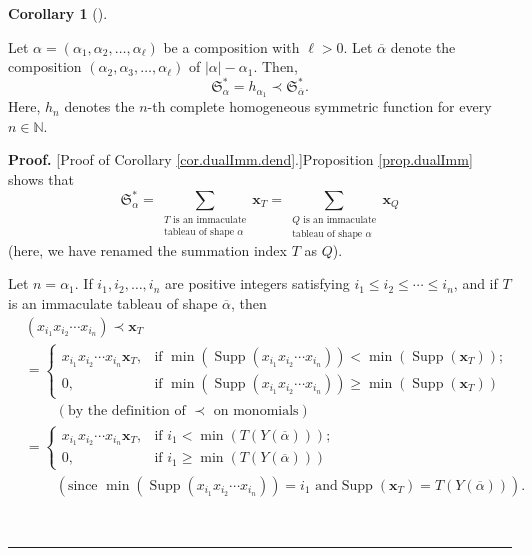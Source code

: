 \documentclass[numbers=enddot,12pt,final,onecolumn,notitlepage,abstracton]{scrartcl}%
\theoremstyle{definition}
\newtheorem{coro}[theo]{Corollary}
\newenvironment{corollary}[1][]
{\begin{coro}[#1]\begin{leftbar}}
{\end{leftbar}\end{coro}}
\newenvironment{proof}[1][Proof]{\noindent\textbf{#1.} }{\ \rule{0.5em}{0.5em}}
\let\sumnonlimits\sum
\renewcommand{\sum}{\sumnonlimits\limits}
\begin{document}
\begin{corollary}
\label{cor.dualImm.dend}Let $\alpha=\left(  \alpha_{1},\alpha_{2}%
,\ldots,\alpha_{\ell}\right)  $ be a composition with $\ell>0$. Let
$\overline{\alpha}$ denote the composition $\left(  \alpha_{2},\alpha
_{3},\ldots,\alpha_{\ell}\right)  $ of $\left\vert \alpha\right\vert
-\alpha_{1}$. Then,%
\[
\mathfrak{S}_{\alpha}^{\ast}=h_{\alpha_{1}}\left.  \prec\right.
\mathfrak{S}_{\overline{\alpha}}^{\ast}.
\]
Here, $h_{n}$ denotes the $n$-th complete homogeneous symmetric function for
every $n\in\mathbb{N}$.
\end{corollary}

\begin{proof}
[Proof of Corollary \ref{cor.dualImm.dend}.]Proposition \ref{prop.dualImm}
shows that
\begin{equation}
\mathfrak{S}_{\alpha}^{\ast}=\sum_{\substack{T\text{ is an immaculate}%
\\\text{tableau of shape }\alpha}}\mathbf{x}_{T}=\sum_{\substack{Q\text{ is an
immaculate}\\\text{tableau of shape }\alpha}}\mathbf{x}_{Q}
\label{pf.cor.dualImm.dend.LHS}%
\end{equation}
(here, we have renamed the summation index $T$ as $Q$).

Let $n=\alpha_{1}$. If $i_{1},i_{2},\ldots,i_{n}$ are positive integers
satisfying $i_{1}\leq i_{2}\leq\cdots\leq i_{n}$, and if $T$ is an immaculate
tableau of shape $\overline{\alpha}$, then%
\begin{align}
&  \left(  x_{i_{1}}x_{i_{2}}\cdots x_{i_{n}}\right)  \left.  \prec\right.
\mathbf{x}_{T}\nonumber\\
&  =
\begin{cases}
x_{i_{1}}x_{i_{2}}\cdots x_{i_{n}}\mathbf{x}_{T}, & \text{if } \min\left(
\operatorname*{Supp}\left(  x_{i_{1}}x_{i_{2}}\cdots x_{i_{n}}\right)
\right)  <\min\left(  \operatorname*{Supp}\left(  \mathbf{x}_{T}\right)
\right)  ;\\
0, & \text{if }\min\left(  \operatorname*{Supp}\left(  x_{i_{1}}x_{i_{2}%
}\cdots x_{i_{n}}\right)  \right)  \geq\min\left(  \operatorname*{Supp}\left(
\mathbf{x}_{T}\right)  \right)
\end{cases}
\nonumber\\
&  \ \ \ \ \ \ \ \ \ \ \left(  \text{by the definition of }\left.
\prec\right.  \text{ on monomials}\right) \nonumber\\
&  =
\begin{cases}
x_{i_{1}}x_{i_{2}}\cdots x_{i_{n}}\mathbf{x}_{T}, & \text{if } i_{1}%
<\min\left(  T\left(  Y\left(  \overline{\alpha}\right)  \right)  \right)  ;\\
0, & \text{if }i_{1}\geq\min\left(  T\left(  Y\left(  \overline{\alpha
}\right)  \right)  \right)
\end{cases}
\label{pf.cor.dualImm.dend.1}\\
&  \ \ \ \ \ \ \ \ \ \ \left(  \text{since }\min\left(  \operatorname*{Supp}%
\left(  x_{i_{1}}x_{i_{2}}\cdots x_{i_{n}}\right)  \right)  =i_{1}\text{ and
}\operatorname*{Supp}\left(  \mathbf{x}_{T}\right)  =T\left(  Y\left(
\overline{\alpha}\right)  \right)  \right)  .\nonumber
\end{align}



\end{proof}
\end{document}
